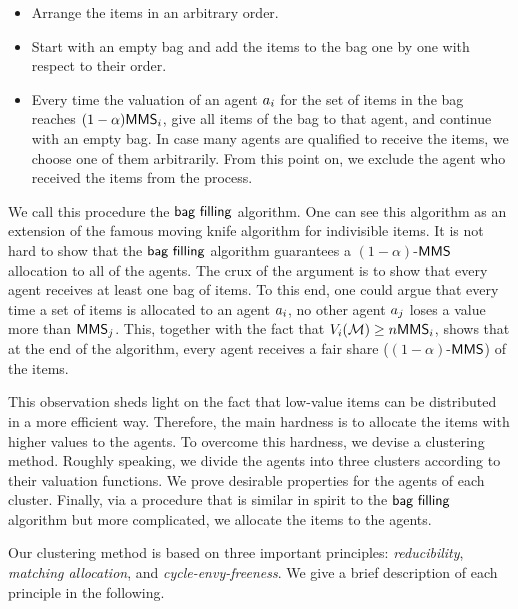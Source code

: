 \begin{itemize}
	\item Arrange the items in an arbitrary order.
	\item Start with an empty bag and add the items to the bag one by one with respect to their order.
	\item Every time the valuation of an agent $a_i$ for the set of items in the bag reaches $(1-\alpha)\mathsf{MMS}_i$, give all items of the bag to that agent, and continue with an empty bag.  In case many agents are qualified to receive the items, we choose one of them arbitrarily. From this point on, we exclude the agent who received the items from the process.
\end{itemize}
We call this procedure the $\textsf{bag filling}$ algorithm. One can see this algorithm as an extension of the famous moving knife algorithm for indivisible items.
It is not hard to show that the $\textsf{bag filling}$ algorithm guarantees a $(1-\alpha)$-$\mathsf{MMS}$ allocation to all of the agents. The crux of the argument is to show that every agent receives at least one bag of items. To this end, one could argue that every time a set of items is allocated to an agent $a_i$, no other agent $a_{j}$ loses a value more than $\mathsf{MMS}_j$. This, together with the fact that $V_i(\mathcal{M}) \geq n \mathsf{MMS}_i$, shows that at the end of the algorithm, every agent receives a fair share ($(1-\alpha)$-$\mathsf{MMS}$) of the items. 

This observation sheds light on the fact that low-value items can be distributed in a more efficient way. Therefore, the main hardness is to allocate the items with higher values to the agents. To overcome this hardness, we devise a clustering method.
Roughly speaking, we divide the agents into three clusters according to their valuation functions. We prove desirable properties for the agents of each cluster. Finally, via a procedure that is similar in spirit to the $\textsf{bag filling}$ algorithm but more complicated, we allocate the items to the agents. 

Our clustering method is based on three important principles: \textit{reducibility}, \textit{matching allocation}, and \textit{cycle-envy-freeness}. %
We give a brief description of each principle in the following.

